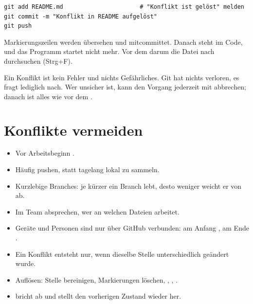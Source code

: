 \begin{lstlisting}[style=befehle]
git add README.md                      # "Konflikt ist gelöst" melden
git commit -m "Konflikt in README aufgelöst"
git push
\end{lstlisting}

\begin{fehler}
Markierungszeilen werden übersehen und mitcommittet. Danach steht  im Code,
und das Programm startet nicht mehr. Vor dem  darum die Datei nach
\cmd{<<<<<<<} durchsuchen (Strg+F).
\end{fehler}

\begin{erfahrung}
Ein Konflikt ist kein Fehler und nichts Gefährliches. Git hat nichts verloren, es fragt
lediglich nach. Wer unsicher ist, kann den Vorgang jederzeit mit 
abbrechen; danach ist alles wie vor dem .
\end{erfahrung}

\section{Konflikte vermeiden}

\begin{itemize}
  \item Vor Arbeitsbeginn .
  \item Häufig pushen, statt tagelang lokal zu sammeln.
  \item Kurzlebige Branches: je kürzer ein Branch lebt, desto weniger weicht er von  ab.
  \item Im Team absprechen, wer an welchen Dateien arbeitet.
\end{itemize}

\begin{zusammenfassung}
\begin{itemize}[nosep]
  \item Geräte und Personen sind nur über GitHub verbunden: am Anfang , am Ende .
  \item Ein Konflikt entsteht nur, wenn dieselbe Stelle unterschiedlich geändert wurde.
  \item Auflösen: Stelle bereinigen, Markierungen löschen, , , .
  \item {} bricht ab und stellt den vorherigen Zustand wieder her.
\end{itemize}
\end{zusammenfassung}
